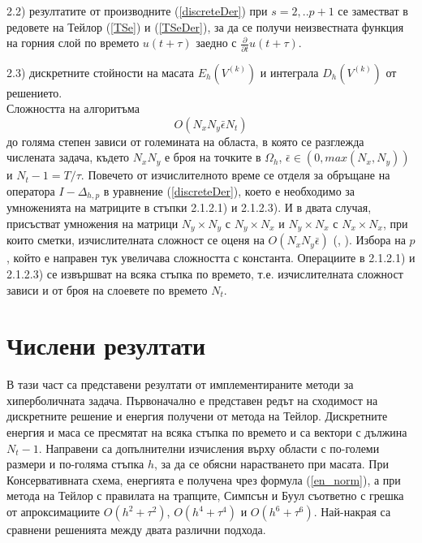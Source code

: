 \documentclass{article}
\newcommand{\rf}[1]{(\ref{#1})}
\begin{document}
2.2) резултатите от производните \rf{discreteDer} при $s=2,..p+1$ се заместват в редовете на Тейлор \rf{TSe} и \rf{TSeDer}, за да се получи неизвестната функция на горния слой по времето $u(t+\tau)$ заедно с $ \frac{\partial}{\partial t}u(t+\tau)$.
\par
2.3) дискретните стойности на масата $E_h(V^{(k)})$ и интеграла $D_h(V^{(k)})$ от решението.
\\
Сложността на алгоритъма 
$$ O(N_x N_y \bar \epsilon N_t ) $$
до голяма степен зависи от големината на областа, в която се разглежда числената задача, където $N_x N_y$ е броя на точките в $\Omega_h$, $\bar\epsilon \in (0, max(N_x,N_y) )$ и $N_t -1= T/\tau$. Повечето от изчислителното време се отделя за обръщане на оператора $I-\Delta_{h,p}$ в уравнение \rf{discreteDer}, което е необходимо за умноженията на матриците в стъпки 2.1.2.1) и 2.1.2.3). И в двата случая, присъстват умножения на матрици $N_y \times N_y$ с  $N_y \times N_x$ и $N_y \times N_x$ с  $N_x \times N_x$, при които сметки, изчислителната сложност се оценя на $ O( N_x N_y \bar\epsilon)$ (\cite{ref26}, \cite{ref27}). Избора на $p$, който е направен тук увеличава сложността с константа. Операциите в 2.1.2.1) и 2.1.2.3) се извършват на всяка стъпка по времето, т.е. изчислителната сложност зависи и от броя на слоевете по времето $N_t$.

\section{Числени резултати}
В тази част са представени резултати от имплементираните методи за хиперболичната задача.
Първоначално е представен редът на сходимост на дискретните решение и енергия получени от метода на Тейлор. Дискретните енергия и маса се пресмятат на всяка стъпка по времето и са вектори с дължина $N_t - 1$. Направени са допълнителни изчисления върху области с по-големи размери и по-голяма стъпка $h$, за да се обясни нарастването при масата. При Консервативната схема, енергията е получена чрез формула \rf{en_norm}, а при метода на Тейлор с правилата на трапците, Симпсън и Буул съответно с грешка от апроксимациите $O(h^{2} + \tau^2 )$, $O(h^{4} + \tau^4 )$ и $O(h^{6} + \tau^6 )$. Най-накрая са сравнени решенията между двата различни подхода. 
\end{document}
